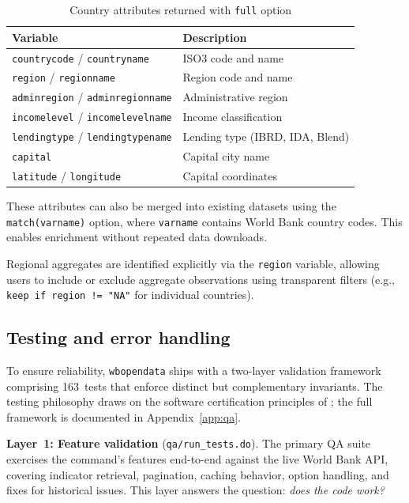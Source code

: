 \documentclass[bib]{statapress}
\begin{document}
\begin{table}[htbp]
\centering
\caption{Country attributes returned with \texttt{full} option}
\label{tab:attributes}
\begin{tabular}{ll}
\hline
Variable & Description \\
\hline
\texttt{countrycode} / \texttt{countryname} & ISO3 code and name \\
\texttt{region} / \texttt{regionname} & Region code and name \\
\texttt{adminregion} / \texttt{adminregionname} & Administrative region \\
\texttt{incomelevel} / \texttt{incomelevelname} & Income classification \\
\texttt{lendingtype} / \texttt{lendingtypename} & Lending type (IBRD, IDA, Blend) \\
\texttt{capital} & Capital city name \\
\texttt{latitude} / \texttt{longitude} & Capital coordinates \\
\hline
\end{tabular}
\end{table}

These attributes can also be merged into existing datasets using the
\texttt{match(varname)} option, where \texttt{varname} contains World Bank
country codes. This enables enrichment without repeated data downloads.

Regional aggregates are identified explicitly via the \texttt{region} variable,
allowing users to include or exclude aggregate observations using transparent
filters (e.g., \texttt{keep if region != "NA"} for individual countries).

\subsection{Testing and error handling}

To ensure reliability, \texttt{wbopendata} ships with a two-layer validation
framework comprising 163~tests that enforce distinct but complementary
invariants. The testing philosophy draws on the software certification
principles of \citet{gould2001certification}; the full framework is
documented in Appendix~\ref{app:qa}.

\textbf{Layer~1: Feature validation} (\texttt{qa/run\_tests.do}).  The
primary QA suite exercises the command's features end-to-end against the
live World Bank API, covering indicator retrieval, pagination, caching
behavior, option handling, and fixes for historical issues.  This layer
answers the question: \emph{does the code work?}
\end{document}
